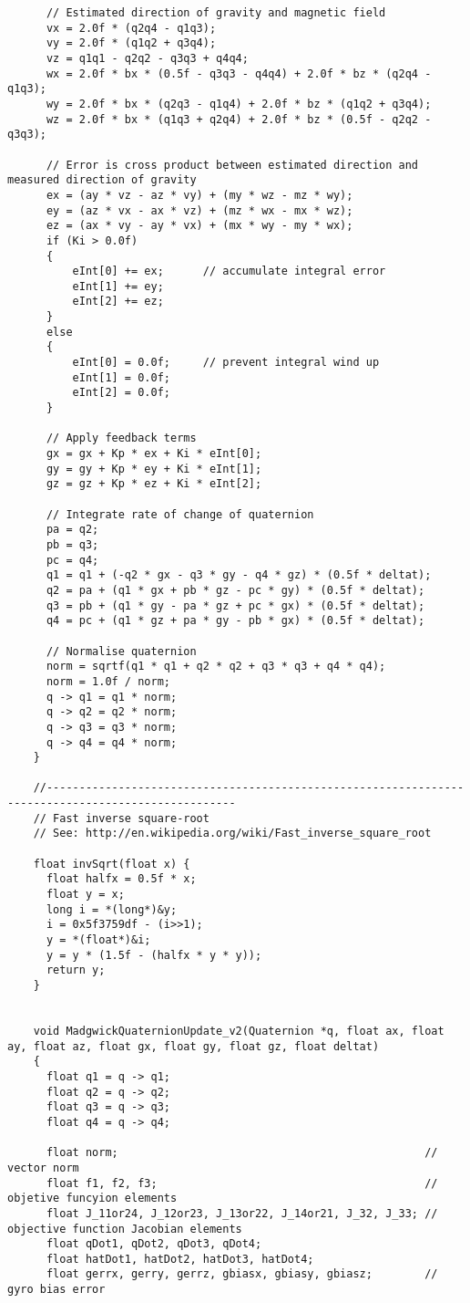 \begin{lstlisting}
	  // Estimated direction of gravity and magnetic field
	  vx = 2.0f * (q2q4 - q1q3);
	  vy = 2.0f * (q1q2 + q3q4);
	  vz = q1q1 - q2q2 - q3q3 + q4q4;
	  wx = 2.0f * bx * (0.5f - q3q3 - q4q4) + 2.0f * bz * (q2q4 - q1q3);
	  wy = 2.0f * bx * (q2q3 - q1q4) + 2.0f * bz * (q1q2 + q3q4);
	  wz = 2.0f * bx * (q1q3 + q2q4) + 2.0f * bz * (0.5f - q2q2 - q3q3);  

	  // Error is cross product between estimated direction and measured direction of gravity
	  ex = (ay * vz - az * vy) + (my * wz - mz * wy);
	  ey = (az * vx - ax * vz) + (mz * wx - mx * wz);
	  ez = (ax * vy - ay * vx) + (mx * wy - my * wx);
	  if (Ki > 0.0f)
	  {
	      eInt[0] += ex;      // accumulate integral error
	      eInt[1] += ey;
	      eInt[2] += ez;
	  }
	  else
	  {
	      eInt[0] = 0.0f;     // prevent integral wind up
	      eInt[1] = 0.0f;
	      eInt[2] = 0.0f;
	  }

	  // Apply feedback terms
	  gx = gx + Kp * ex + Ki * eInt[0];
	  gy = gy + Kp * ey + Ki * eInt[1];
	  gz = gz + Kp * ez + Ki * eInt[2];

	  // Integrate rate of change of quaternion
	  pa = q2;
	  pb = q3;
	  pc = q4;
	  q1 = q1 + (-q2 * gx - q3 * gy - q4 * gz) * (0.5f * deltat);
	  q2 = pa + (q1 * gx + pb * gz - pc * gy) * (0.5f * deltat);
	  q3 = pb + (q1 * gy - pa * gz + pc * gx) * (0.5f * deltat);
	  q4 = pc + (q1 * gz + pa * gy - pb * gx) * (0.5f * deltat);

	  // Normalise quaternion
	  norm = sqrtf(q1 * q1 + q2 * q2 + q3 * q3 + q4 * q4);
	  norm = 1.0f / norm;
	  q -> q1 = q1 * norm;
	  q -> q2 = q2 * norm;
	  q -> q3 = q3 * norm;
	  q -> q4 = q4 * norm;
	}

	//---------------------------------------------------------------------------------------------------
	// Fast inverse square-root
	// See: http://en.wikipedia.org/wiki/Fast_inverse_square_root

	float invSqrt(float x) {
	  float halfx = 0.5f * x;
	  float y = x;
	  long i = *(long*)&y;
	  i = 0x5f3759df - (i>>1);
	  y = *(float*)&i;
	  y = y * (1.5f - (halfx * y * y));
	  return y;
	}


	void MadgwickQuaternionUpdate_v2(Quaternion *q, float ax, float ay, float az, float gx, float gy, float gz, float deltat)
	{
	  float q1 = q -> q1;
	  float q2 = q -> q2;
	  float q3 = q -> q3;
	  float q4 = q -> q4;

	  float norm;                                               // vector norm
	  float f1, f2, f3;                                         // objetive funcyion elements
	  float J_11or24, J_12or23, J_13or22, J_14or21, J_32, J_33; // objective function Jacobian elements
	  float qDot1, qDot2, qDot3, qDot4;
	  float hatDot1, hatDot2, hatDot3, hatDot4;
	  float gerrx, gerry, gerrz, gbiasx, gbiasy, gbiasz;        // gyro bias error


\end{lstlisting}
